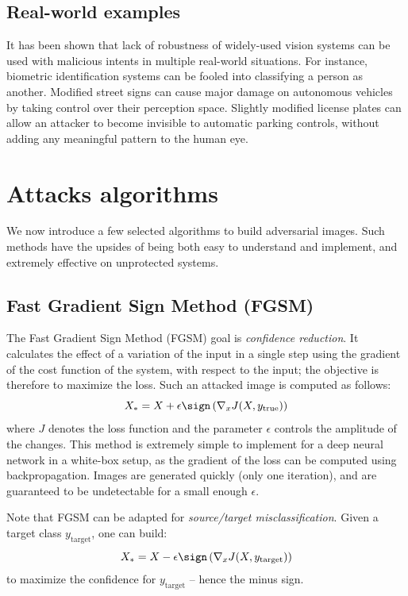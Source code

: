 \documentclass[twocolumn]{../cs-classes/cs-classes}
\begin{document}
\subsection{Real-world examples}
It has been shown that lack of robustness of widely-used vision systems can be used with malicious intents in multiple real-world situations. For instance, biometric identification systems can be fooled into classifying a person as another. Modified street signs can cause major damage on autonomous vehicles by taking control over their perception space. Slightly modified license plates can allow an attacker to become invisible to automatic parking controls, without adding any meaningful pattern to the human eye.

\section{Attacks algorithms}
\label{sec:attacks-algorithms}
We now introduce a few selected algorithms to build adversarial images. Such methods have the upsides of being both easy to understand and implement, and extremely effective on unprotected systems.

\subsection{Fast Gradient Sign Method (FGSM)}
The Fast Gradient Sign Method (FGSM) \cite{goodfellow2014explaining} goal is \emph{confidence reduction}. It calculates the effect of a variation of the input in a single step using the gradient of the cost function of the system, with respect to the input; the objective is therefore to maximize the loss. Such an attacked image is computed as follows:
\begin{equation*}
    X_* = X + \epsilon\sign\left(\nabla_x J(X, y_{\text{true}})\right)
\end{equation*}
where $J$ denotes the loss function and the parameter $\epsilon$ controls the amplitude of the changes.
This method is extremely simple to implement for a deep neural network in a white-box setup, as the gradient of the loss can be computed using backpropagation. Images are generated quickly (only one iteration), and are guaranteed to be undetectable for a small enough $\epsilon$.

Note that FGSM can be adapted for \emph{source/target misclassification}. Given a target class $y_{\text{target}}$, one can build:
\begin{equation*}
    X_* = X - \epsilon\sign\left(\nabla_x J(X, y_{\text{target}})\right)
\end{equation*}
to maximize the confidence for $y_{\text{target}}$ -- hence the minus sign.
\end{document}
